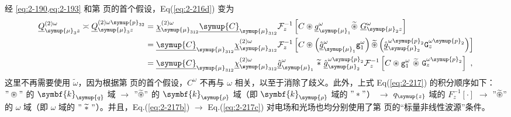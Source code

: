 经 \cref{eq:2-190,eq:2-193} 和第 \pageref{con:4} 页的首个假设，Eq(\ref{eq:2-216d}) 变为
\begin{subequations} \label{eq:2-217}
	\abovedisplayskip=13pt
	\belowdisplayskip=13pt
	\begin{align}
		{\underline{Q}}^{(2)\omega}_{{\symup{\mu}}_{3}z} \asymp {\underline{Q}}^{(2)\omega{\symup{p}}_{32}}_{{\symup{\mu}}_{3}z} &= {\underline{\chi}}^{(2)\omega}_{{\symup{\mu}}_{312}} {\underline{\symup{C}}}_{{\symup{\mu}}_{312}} \mathcal F^{-1}_{z} \left[ C \circledast \underline{g}^{\omega}_{{\symup{\mu}}_1} \widetilde \circledast\ \underline{G}^{\omega}_{{\symup{\mu}}_2 z} \right] \label{eq:2-217a} \\ &= {\underline{\symup{C}}}_{{\symup{\mu}}_{312}} {\underline{\chi}}^{(2)\omega}_{{\symup{\mu}}_{312}} \mathcal F^{-1}_{z} \left[ C \circledast \left( \hat{\underline{g}}^{\omega}_{{\symup{\mu}}_1} {\mathtt{g}}^{\omega}_1 \right) \widetilde \circledast \left( \hat{\underline{g}}^{\omega{\symup{p}}_{2}}_{{\symup{\mu}}_2} {\mathtt{G}}^{\omega{\symup{p}}_{2}}_{z} \right) \right] \label{eq:2-217b} \\ &= {\underline{\symup{C}}}_{{\symup{\mu}}_{312}} {\underline{\chi}}^{(2)\omega}_{{\symup{\mu}}_{312}} \hat{\underline{g}}^{\omega}_{{\symup{\mu}}_1} \ \widetilde *\ \hat{\underline{g}}^{\omega{\symup{p}}_{2}}_{{\symup{\mu}}_2} \mathcal F^{-1}_{z} \left[ C \circledast {\mathtt{g}}^{\omega}_1 \ \widetilde \circledast\ {\mathtt{G}}^{\omega{\symup{p}}_{2}}_{z} \right] \label{eq:2-217c}~, 
	\end{align}
\end{subequations}
这里不再需要使用 $\widetilde \omega$，因为根据第 \pageref{con:4} 页的首个假设，$C^\omega$ 不再与 $\omega$ 相关，以至于消除了歧义。此外，上式 Eq(\ref{eq:2-217}) 的积分顺序如下：$"\circledast"$ 的 $\symbf{k}_{\symup{q}}$ 域 $\to$ $"\widetilde \circledast"$ 的 $\symbf{k}_{\symup{\rho}}$ 域（即 $\symbf{k}_{\symup{\rho}}$ 域的 $"*"$） $\to$ $q_{\symup{z}}$ 域的 $F^{-1}_{z} \left[ \cdot \right]$ $\to$ $"\widetilde \circledast"$ 的 $\omega$ 域（即 $\omega$ 域的 $"\ \widetilde *\ "$）。并且，Eq.(\ref{eq:2-217b}) $\to$ Eq.(\ref{eq:2-217c}) 对电场和光场也均分别使用了第 \pageref{con:3} 页的“标量非线性波源”条件。

